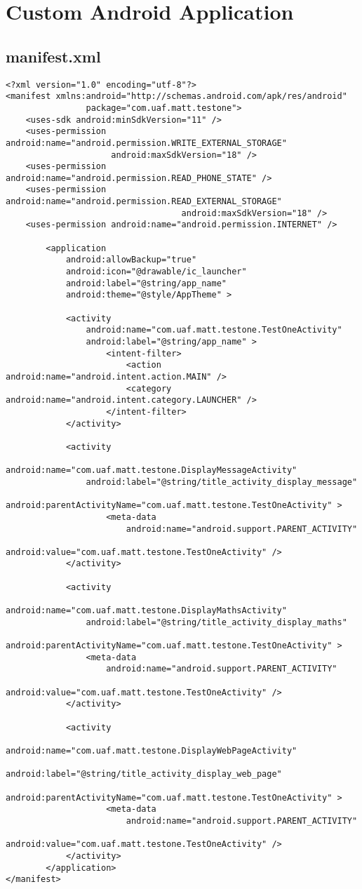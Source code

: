\section{Custom Android Application}
\label{app:customapp}
\subsection{manifest.xml}
\label{app:camanifest}
\begin{lstlisting}
<?xml version="1.0" encoding="utf-8"?>
<manifest xmlns:android="http://schemas.android.com/apk/res/android"
                package="com.uaf.matt.testone">
    <uses-sdk android:minSdkVersion="11" />
    <uses-permission android:name="android.permission.WRITE_EXTERNAL_STORAGE"
                     android:maxSdkVersion="18" />
    <uses-permission android:name="android.permission.READ_PHONE_STATE" />
    <uses-permission android:name="android.permission.READ_EXTERNAL_STORAGE"
                                   android:maxSdkVersion="18" />
    <uses-permission android:name="android.permission.INTERNET" />

        <application
            android:allowBackup="true"
            android:icon="@drawable/ic_launcher"
            android:label="@string/app_name"
            android:theme="@style/AppTheme" >

            <activity
                android:name="com.uaf.matt.testone.TestOneActivity"
                android:label="@string/app_name" >
                    <intent-filter>
                        <action android:name="android.intent.action.MAIN" />
                        <category android:name="android.intent.category.LAUNCHER" />
                    </intent-filter>
            </activity>

            <activity
                android:name="com.uaf.matt.testone.DisplayMessageActivity"
                android:label="@string/title_activity_display_message"
                android:parentActivityName="com.uaf.matt.testone.TestOneActivity" >
                    <meta-data
                        android:name="android.support.PARENT_ACTIVITY"
                        android:value="com.uaf.matt.testone.TestOneActivity" />
            </activity>

            <activity
                android:name="com.uaf.matt.testone.DisplayMathsActivity"
                android:label="@string/title_activity_display_maths"
                android:parentActivityName="com.uaf.matt.testone.TestOneActivity" >
                <meta-data
                    android:name="android.support.PARENT_ACTIVITY"
                    android:value="com.uaf.matt.testone.TestOneActivity" />
            </activity>

            <activity
                android:name="com.uaf.matt.testone.DisplayWebPageActivity"
                android:label="@string/title_activity_display_web_page"
                android:parentActivityName="com.uaf.matt.testone.TestOneActivity" >
                    <meta-data
                        android:name="android.support.PARENT_ACTIVITY"
                        android:value="com.uaf.matt.testone.TestOneActivity" />
            </activity>
        </application>
</manifest>
\end{lstlisting}
